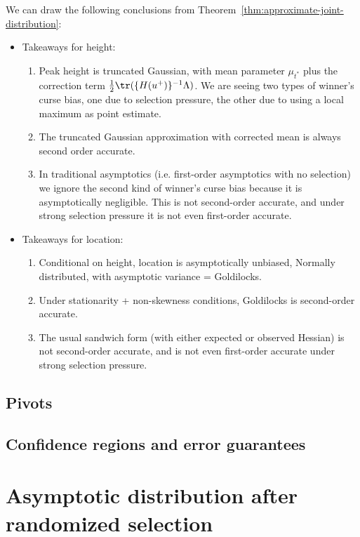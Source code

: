 \documentclass{article}
\newcommand{\ag}[1]{{\bf{{\red{[{AG: #1}]}}}}}
\begin{document}
	We can draw the following conclusions from Theorem~\ref{thm:approximate-joint-distribution}:
	\begin{itemize}
		\item Takeaways for height: 
		\begin{enumerate}
			\item Peak height is truncated Gaussian, with mean parameter $\mu_{t^*}$ plus the correction term $\frac{1}{2}\tr(\{H(u^+)\}^{-1}\Lambda)$. We are seeing two types of winner's curse bias, one due to selection pressure, the other due to using a local maximum as point estimate.
			\item The truncated Gaussian approximation with corrected mean is always second order accurate.
			\item In traditional asymptotics (i.e. first-order asymptotics with no selection) we ignore the second kind of winner's curse bias because it is asymptotically negligible. This is not second-order accurate, and under strong selection pressure it is not even first-order accurate.
		\end{enumerate}
		\item Takeaways for location: 
		\begin{enumerate}
			\item Conditional on height, location is asymptotically unbiased, Normally distributed, with asymptotic variance = Goldilocks. 
			\item Under stationarity + non-skewness conditions, Goldilocks is second-order accurate. \ag{Will need to elaborate}
			\item The usual sandwich form (with either expected or observed Hessian) is not second-order accurate, and is not even first-order accurate under strong selection pressure.
		\end{enumerate}
	\end{itemize}

	\subsection{Pivots}
	\ag{TO COME}
	
	\subsection{Confidence regions and error guarantees}
	\ag{TO COME}
	
	\section{Asymptotic distribution after randomized selection}
	\label{sec:asymptotic-distribution-after-randomized-selection}
	
\end{document}
